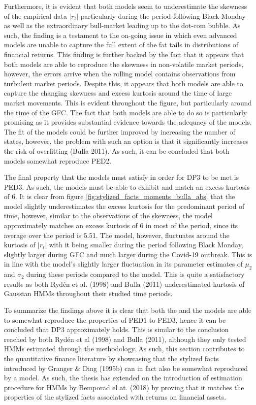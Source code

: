 Furthermore, it is evident that both models seem to underestimate the skewness of the empirical data $|r_t|$ particularly during the period following Black Monday as well as the extraordinary bull-market leading up to the dot-com bubble. As such, the finding is a testament to the on-going issue in which even advanced models are unable to capture the full extent of the fat tails in distributions of financial returns. This finding is further backed by the fact that it appears that both models are able to reproduce the skewness in non-volatile market periods, however, the errors arrive when the rolling model contains observations from turbulent market periods. Despite this, it appears that both models are able to capture the changing skewness and excess kurtosis around the time of large market movements. This is evident throughout the figure, but particularly around the time of the GFC. The fact that both models are able to do so is particularly promising as it provides substantial evidence towards the adequacy of the models. The fit of the models could be further improved by increasing the number of states, however, the problem with such an option is that it significantly increases the risk of overfitting (Bulla 2011). As such, it can be concluded that both models somewhat reproduce PED2.

The final property that the models must satisfy in order for DP3 to be met is PED3. As such, the models must be able to exhibit and match an excess kurtosis of 6. It is clear from figure \ref{fig:stylized_facts_moments_bulla_abs} that the \mle model slightly underestimates the excess kurtosis for the predominant period of time, however, similar to the observations of the skewness, the model approximately matches an excess kurtosis of 6 in most of the period, since its average over the period is 5.51. The \jump model, however, fluctuates around the kurtosis of $|r_t|$ with it being smaller during the period following Black Monday, slightly larger during GFC and much larger during the Covid-19 outbreak. This is in line with the \jump model's slightly larger fluctuation in its parameter estimates of $\mu_2$ and $\sigma_2$ during these periods compared to the \mle model. This is quite a satisfactory results as both Rydén et al. (1998) and Bulla (2011) underestimated kurtosis of Gaussian HMMs throughout their studied time periods.

To summarize the findings above it is clear that both the \mle and the \jump models are able to somewhat reproduce the properties of PED1 to PED3, hence it can be concluded that DP3 approximately holds. This is similar to the conclusion reached by both Rydén et al (1998) and Bulla (2011), although they only tested HMMs estimated through the \mle methodology. As such, this section contributes to the quantitative finance literature by showcasing that the stylized facts introduced by Granger \& Ding (1995b) can in fact also be somewhat reproduced by a \jump model. As such, the thesis has extended on the introduction of \jump estimation procedure for HMMs by Bemporad el at. (2018) by proving that it matches the properties of the stylized facts associated with returns on financial assets.

